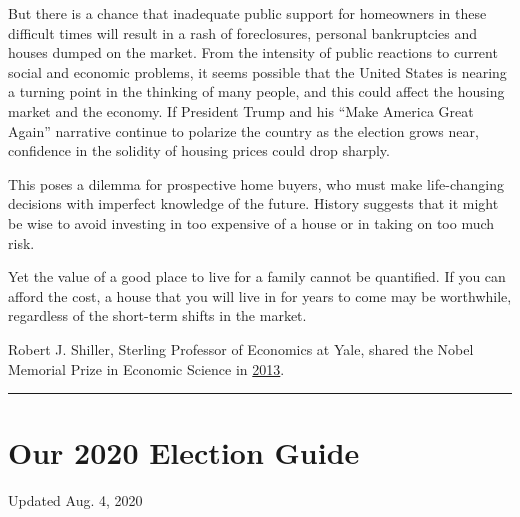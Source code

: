 But there is a chance that inadequate public support for homeowners in
these difficult times will result in a rash of foreclosures, personal
bankruptcies and houses dumped on the market. From the intensity of
public reactions to current social and economic problems, it seems
possible that the United States is nearing a turning point in the
thinking of many people, and this could affect the housing market and
the economy. If President Trump and his ``Make America Great Again''
narrative continue to polarize the country as the election grows near,
confidence in the solidity of housing prices could drop sharply.

This poses a dilemma for prospective home buyers, who must make
life-changing decisions with imperfect knowledge of the future. History
suggests that it might be wise to avoid investing in too expensive of a
house or in taking on too much risk.

Yet the value of a good place to live for a family cannot be quantified.
If you can afford the cost, a house that you will live in for years to
come may be worthwhile, regardless of the short-term shifts in the
market.

Robert J. Shiller, Sterling Professor of Economics at Yale, shared the
Nobel Memorial Prize in Economic Science in
\href{https://www.nytimes.com/2013/10/15/business/3-american-professors-awarded-nobel-in-economic-sciences.html?_r=0}{2013}.

\begin{center}\rule{0.5\linewidth}{\linethickness}\end{center}

\hypertarget{our-2020-election-guide}{%
\section{Our 2020 Election Guide}\label{our-2020-election-guide}}

Updated Aug. 4, 2020

